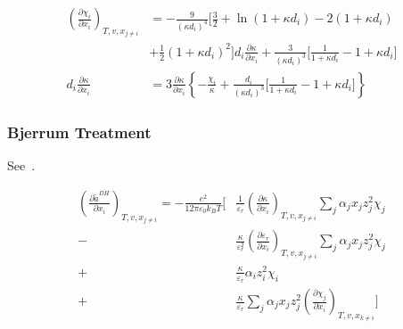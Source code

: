 \documentclass[12pt, letterpaper]{article}
\begin{document}

\begin{equation}
    \begin{aligned}
        \left(\frac{\partial\chi_{i}}{\partial x_{i}}\right)_{T,v,x_{j\neq i}} & =-\frac{9}{\left(\kappa d_{i}\right)^{4}}\biggl[\frac{3}{2}+\ln(1+\kappa d_{i})-2(1+\kappa d_{i}) \\&+\frac{1}{2}\left(1+\kappa d_{i}\right)^{2}\bigg]d_{i}\frac{\partial\kappa}{\partial x_{i}}+\frac{3}{\left(\kappa d_{i}\right)^{3}}\bigg[\frac{1}{1+\kappa d_{i}}-1+\kappa d_{i}\bigg]\\d_{i}\frac{\partial\kappa}{\partial x_{i}}&= 3\frac{\partial\kappa}{\partial x_{i}}\left\{-\frac{\chi_{i}}{\kappa}+\frac{d_{i}}{\left(\kappa d_{i}\right)^{3}}\biggl[\frac{1}{1+\kappa d_{i}}-1+\kappa d_{i}\biggr]\right\}
    \end{aligned}
    \label{eq:dchi_dh_dxi}
\end{equation}

\subsubsection{Bjerrum Treatment}

See~\cite{Bulow2021}.

\begin{equation}
    \begin{aligned}
        \left(\frac{\partial \tilde{a}^{DH}}{\partial x_{i}}\right)_{T,v,x_{j\neq i}}
        =
        -\frac{e^{2}}{12\pi\varepsilon_{0}k_{B}T}
        \Bigg[
          & \frac{1}{\varepsilon_{r}}\left(\frac{\partial\kappa}{\partial x_{i}}\right)_{T,v,x_{j\neq i}}
            \sum_{j}\alpha_{j}x_{j}z_{j}^{2}\chi_{j}
        \\
        - & \frac{\kappa}{\varepsilon_{r}^{2}}
            \left(\frac{\partial\varepsilon_{r}}{\partial x_{i}}\right)_{T,v,x_{j\neq i}}
            \sum_{j}\alpha_{j}x_{j}z_{j}^{2}\chi_{j}
        \\
        + & \frac{\kappa}{\varepsilon_{r}}\alpha_{i}z_{i}^{2}\chi_{i}
        \\
        + & \frac{\kappa}{\varepsilon_{r}}
            \sum_{j}\alpha_{j}x_{j}z_{j}^{2}
            \left(\frac{\partial\chi_{j}}{\partial x_{i}}\right)_{T,v,x_{k\neq i}}
            \Bigg]
    \end{aligned}
    \label{eq:dares_dh_dxi_bjerrum}
\end{equation}
\end{document}
